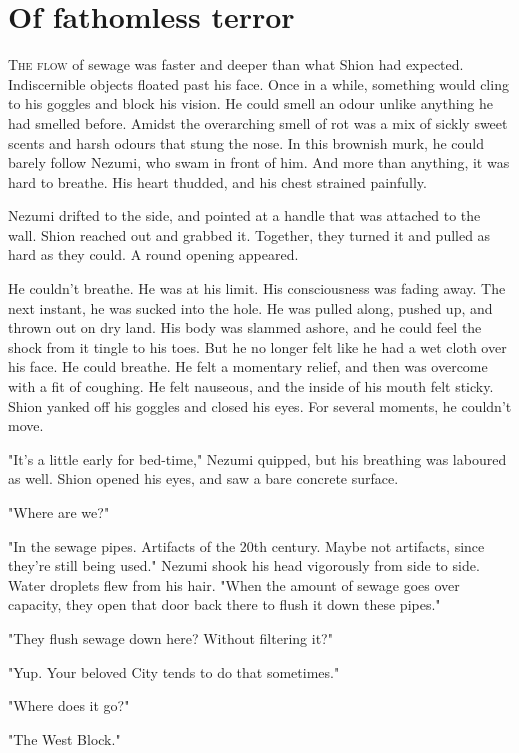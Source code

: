 
\chapter{Of fathomless terror}

\lettrine{T}{he flow} of sewage was faster and deeper than what Shion had expected.
Indiscernible objects floated past his face. Once in a while, something
would cling to his goggles and block his vision. He could smell an odour
unlike anything he had smelled before. Amidst the overarching smell of
rot was a mix of sickly sweet scents and harsh odours that stung the
nose. In this brownish murk, he could barely follow Nezumi, who swam in
front of him. And more than anything, it was hard to breathe. His heart
thudded, and his chest strained painfully.

Nezumi drifted to the side, and pointed at a handle that was attached to
the wall. Shion reached out and grabbed it. Together, they turned it and
pulled as hard as they could. A round opening appeared.

He couldn't breathe. He was at his limit. His consciousness was fading
away. The next instant, he was sucked into the hole. He was pulled
along, pushed up, and thrown out on dry land. His body was slammed
ashore, and he could feel the shock from it tingle to his toes. But he
no longer felt like he had a wet cloth over his face. He could breathe.
He felt a momentary relief, and then was overcome with a fit of
coughing. He felt nauseous, and the inside of his mouth felt sticky.
Shion yanked off his goggles and closed his eyes. For several moments,
he couldn't move.

"It's a little early for bed-time," Nezumi quipped, but his breathing
was laboured as well. Shion opened his eyes, and saw a bare concrete
surface.

"Where are we?"

"In the sewage pipes. Artifacts of the 20th century. Maybe not
artifacts, since they're still being used." Nezumi shook his head
vigorously from side to side. Water droplets flew from his hair. "When
the amount of sewage goes over capacity, they open that door back there
to flush it down these pipes."

"They flush sewage down here? Without filtering it?"

"Yup. Your beloved City tends to do that sometimes."

"Where does it go?"

"The West Block."


